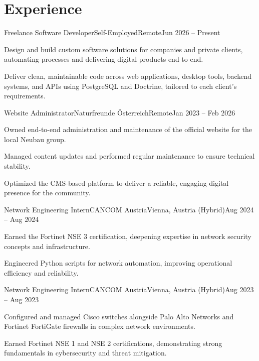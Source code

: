 \section*{Experience}

\begin{workentry}{Freelance Software Developer}{Self-Employed}{Remote}{Jun 2026 -- Present}
  \item Design and build custom software solutions for companies and private clients, automating processes and delivering digital products end-to-end.
  \item Deliver clean, maintainable code across web applications, desktop tools, backend systems, and APIs using PostgreSQL and Doctrine, tailored to each client's requirements.
\end{workentry}

\begin{workentry}{Website Administrator}{Naturfreunde Österreich}{Remote}{Jan 2023 -- Feb 2026}
  \item Owned end-to-end administration and maintenance of the official website for the local Neubau group.
  \item Managed content updates and performed regular maintenance to ensure technical stability.
  \item Optimized the CMS-based platform to deliver a reliable, engaging digital presence for the community.
\end{workentry}

\begin{workentry}{Network Engineering Intern}{CANCOM Austria}{Vienna, Austria (Hybrid)}{Aug 2024 -- Aug 2024}
  \item Earned the Fortinet NSE 3 certification, deepening expertise in network security concepts and infrastructure.
  \item Engineered Python scripts for network automation, improving operational efficiency and reliability.
\end{workentry}

\begin{workentry}{Network Engineering Intern}{CANCOM Austria}{Vienna, Austria (Hybrid)}{Aug 2023 -- Aug 2023}
  \item Configured and managed Cisco switches alongside Palo Alto Networks and Fortinet FortiGate firewalls in complex network environments.
  \item Earned Fortinet NSE 1 and NSE 2 certifications, demonstrating strong fundamentals in cybersecurity and threat mitigation.
\end{workentry}
